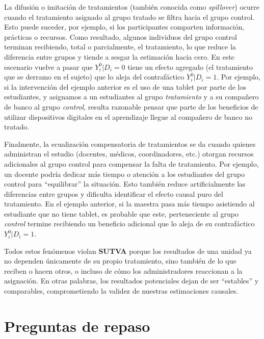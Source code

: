 \documentclass[
  letterpaper,
  DIV=11,
  numbers=noendperiod,
  oneside]{scrreprt}
\begin{document}
La difusión o imitación de tratamientos (también conocida como
\emph{spillover}) ocurre cuando el tratamiento asignado al grupo tratado
se filtra hacia el grupo control. Esto puede suceder, por ejemplo, si
los participantes comparten información, prácticas o recursos. Como
resultado, algunos individuos del grupo control terminan recibiendo,
total o parcialmente, el tratamiento, lo que reduce la diferencia entre
grupos y tiende a sesgar la estimación hacia cero. En este escenario
vuelve a pasar que \(Y_i^0|D_i=0\) tiene un efecto agregado (el
tratamiento que se derramo en el sujeto) que lo aleja del contrafáctico
\(Y_i^0|D_i=1\). Por ejemplo, si la intervención del ejemplo anterior es
el uso de una tablet por parte de los estudiantes, y asignamos a un
estudiantes al grupo \emph{tratamiento} y a su compañero de banco al
grupo \emph{control}, resulta razonable pensar que parte de los
beneficios de utilizar dispositivos digitales en el aprendizaje llegue
al compañero de banco no tratado.

Finalmente, la ecualización compensatoria de tratamientos se da cuando
quienes administran el estudio (docentes, médicos, coordinadores, etc.)
otorgan recursos adicionales al grupo control para compensar la falta de
tratamiento. Por ejemplo, un docente podría dedicar más tiempo o
atención a los estudiantes del grupo control para ``equilibrar'' la
situación. Esto también reduce artificialmente las diferencias entre
grupos y dificulta identificar el efecto causal puro del tratamiento. En
el ejemplo anterior, si la maestra pasa más tiempo asistiendo al
estudiante que no tiene tablet, es probable que este, perteneciente al
grupo \emph{control} termine recibiendo un beneficio adicional que lo
aleja de su contrafáctico \(Y_i^0|D_i=1\).

Todos estos fenómenos violan \textbf{SUTVA} porque los resultados de una
unidad ya no dependen únicamente de su propio tratamiento, sino también
de lo que reciben o hacen otros, o incluso de cómo los administradores
reaccionan a la asignación. En otras palabras, los resultados
potenciales dejan de ser ``estables'' y comparables, comprometiendo la
validez de nuestras estimaciones causales.

\hypertarget{preguntas-de-repaso-2}{%
\section{Preguntas de repaso}\label{preguntas-de-repaso-2}}
\end{document}
